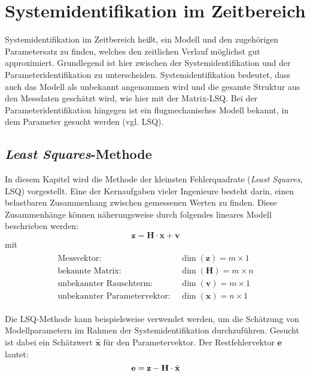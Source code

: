 \chapter{Systemidentifikation im Zeitbereich}
Systemidentifikation im Zeitbereich heißt, ein Modell und den zugehörigen 
Parametersatz zu finden, welches den zeitlichen Verlauf möglichst gut 
approximiert. Grundlegend ist hier zwischen der Systemidentifikation und der 
Parameteridentifikation zu unterscheiden. Systemidentifikation bedeutet, dass 
auch das Modell als unbekannt angenommen wird und die gesamte Struktur aus den 
Messdaten geschätzt wird, wie hier mit der Matrix-LSQ. Bei der 
Parameteridentifikation hingegen ist ein flugmechanisches Modell bekannt, in 
dem Parameter gesucht werden (vgl. LSQ).

\section{\textit{Least Squares}-Methode}
In diesem Kapitel wird die Methode der kleinsten Fehlerquadrate (\textit{Least Squares}, LSQ) vorgestellt.
Eine der Kernaufgaben vieler Ingenieure besteht darin, einen belastbaren Zusammenhang zwischen gemessenen Werten zu finden. 
Diese Zusammenhänge können näherungsweise durch folgendes lineares Modell beschrieben werden:  
\begin{equation}
    \mathbf{z} = \mathbf{H}\cdot \mathbf{x}+\mathbf{v}
\end{equation}
mit 
\begin{align}
	\begin{split}
		\text{Messvektor: } &\dim{(\mathbf{z})} = m\times 1\\
		\text{bekannte Matrix: } &\dim{(\mathbf{H})} = m\times n\\
		\text{unbekannter Rauschterm: } &\dim{(\mathbf{v})} = m\times1\\
		\text{unbekannter Parametervektor: } &\dim{(\mathbf{x})} = n\times 1
		\nonumber
	\end{split}
\end{align}

Die LSQ-Methode kann beispielsweise verwendet werden, um die Schätzung von Modellparametern im Rahmen der 
Systemidentifikation durchzuführen. Gesucht ist dabei ein Schätzwert 
$\mathbf{\hat{x}}$ für den Parametervektor. Der Restfehlervektor 
$\mathbf{e}$ lautet:
\begin{equation}
    \mathbf{e} = \mathbf{z} - \mathbf{H}\cdot \hat{\mathbf{x}} \\
\end{equation}


